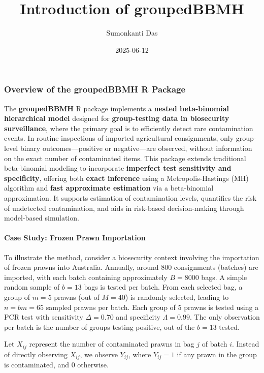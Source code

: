 \documentclass[
]{article}
\title{Introduction of groupedBBMH}
\author{Sumonkanti Das}
\date{2025-06-12}
\begin{document}
\maketitle

\subsubsection{\texorpdfstring{Overview of the \textbf{groupedBBMH} R
Package}{Overview of the groupedBBMH R Package}}\label{overview-of-the-groupedbbmh-r-package}

The \textbf{groupedBBMH} R package implements a \textbf{nested
beta-binomial hierarchical model} designed for \textbf{group-testing
data in biosecurity surveillance}, where the primary goal is to
efficiently detect rare contamination events. In routine inspections of
imported agricultural consignments, only group-level binary
outcomes---positive or negative---are observed, without information on
the exact number of contaminated items. This package extends traditional
beta-binomial modeling to incorporate \textbf{imperfect test sensitivity
and specificity}, offering both \textbf{exact inference} using a
Metropolis-Hastings (MH) algorithm and \textbf{fast approximate
estimation} via a beta-binomial approximation. It supports estimation of
contamination levels, quantifies the risk of undetected contamination,
and aids in risk-based decision-making through model-based simulation.

\paragraph{Case Study: Frozen Prawn
Importation}\label{case-study-frozen-prawn-importation}

To illustrate the method, consider a biosecurity context involving the
importation of frozen prawns into Australia. Annually, around 800
consignments (batches) are imported, with each batch containing
approximately \(B = 8000\) bags. A simple random sample of \(b = 13\)
bags is tested per batch. From each selected bag, a group of \(m = 5\)
prawns (out of \(M = 40\)) is randomly selected, leading to
\(n = bm = 65\) sampled prawns per batch. Each group of 5 prawns is
tested using a PCR test with sensitivity \(\Delta = 0.70\) and
specificity \(\Lambda = 0.99\). The only observation per batch is the
number of groups testing positive, out of the \(b=13\) tested.

Let \(X_{ij}\) represent the number of contaminated prawns in bag \(j\)
of batch \(i\). Instead of directly observing \(X_{ij}\), we observe
\(Y_{ij}\), where \(Y_{ij} = 1\) if any prawn in the group is
contaminated, and 0 otherwise.
\end{document}
